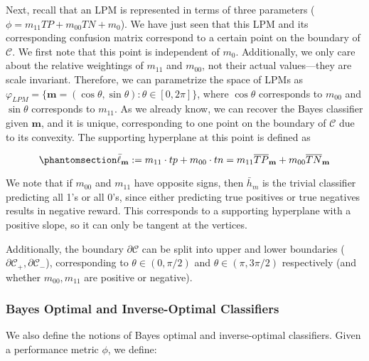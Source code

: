 \documentclass[
  letterpaper,
  numbers=noenddot,
  DIV=11]{scrreprt}
\theoremstyle{definition}
\theoremstyle{plain}
\theoremstyle{plain}
\theoremstyle{remark}
\begin{document}
Next, recall that an LPM is represented in terms of three parameters
(\(\phi = m_{11}TP + m_{00}TN + m_0\)). We have just seen that this LPM
and its corresponding confusion matrix correspond to a certain point on
the boundary of \(\mathcal{C}\). We first note that this point is
independent of \(m_0\). Additionally, we only care about the relative
weightings of \(m_{11}\) and \(m_{00}\), not their actual values---they
are scale invariant. Therefore, we can parametrize the space of LPMs as
\(\varphi_{LPM} = \{\mathbf{m} = (\cos \theta, \sin \theta) : \theta \in [0, 2\pi]\}\),
where \(\cos \theta\) corresponds to \(m_{00}\) and \(\sin \theta\)
corresponds to \(m_{11}\). As we already know, we can recover the Bayes
classifier given \(\mathbf{m}\), and it is unique, corresponding to one
point on the boundary of \(\mathcal{C}\) due to its convexity. The
supporting hyperplane at this point is defined as

\begin{equation}\phantomsection\label{eq-eq3.47}{\bar{\ell}_{\mathbf{m}} := m_{11} \cdot tp + m_{00} \cdot tn = m_{11} \overline{TP}_{\mathbf{m}} + m_{00} \overline{TN}_{\mathbf{m}}}\end{equation}

We note that if \(m_{00}\) and \(m_{11}\) have opposite signs, then
\(\bar{h}_m\) is the trivial classifier predicting all 1's or all 0's,
since either predicting true positives or true negatives results in
negative reward. This corresponds to a supporting hyperplane with a
positive slope, so it can only be tangent at the vertices.

Additionally, the boundary \(\partial \mathcal{C}\) can be split into
upper and lower boundaries
(\(\partial \mathcal{C}_{+}, \partial \mathcal{C}_{-}\)), corresponding
to \(\theta \in (0, \pi/2)\) and \(\theta \in (\pi, 3\pi/2)\)
respectively (and whether \(m_{00}, m_{11}\) are positive or negative).

\subsubsection*{Bayes Optimal and Inverse-Optimal
Classifiers}\label{bayes-optimal-and-inverse-optimal-classifiers}

We also define the notions of Bayes optimal and inverse-optimal
classifiers. Given a performance metric \(\phi\), we define:
\end{document}
